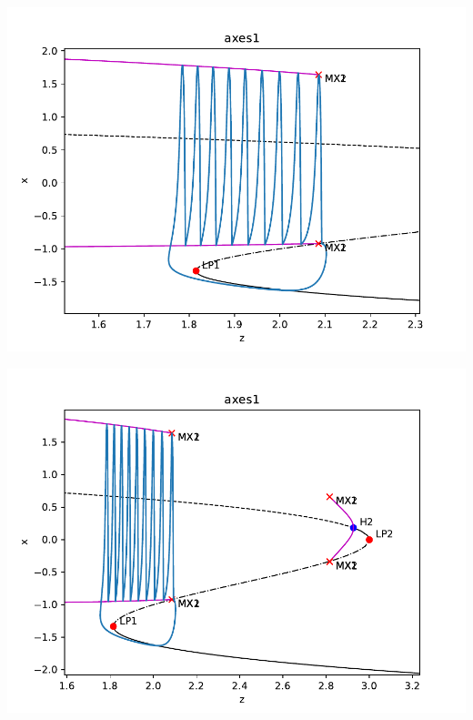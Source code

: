 \documentclass[presentation]{beamer}
\begin{document}
\begin{frame}[plain]

\begin{center}
\includegraphics[width=\textwidth]{pydstool4.pdf}
\end{center}


\end{frame}
\begin{frame}[plain]

\begin{center}
\includegraphics[width=\textwidth]{pydstool2.pdf}
\end{center}
\end{frame}
\end{document}
